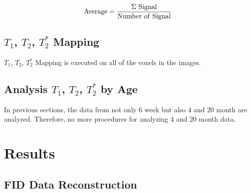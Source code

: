 \documentclass[10pt, a4paper]{article}
\begin{document}
			\begin{equation}
				\rm{Average} = \frac{\Sigma \ Signal}{\rm{Number \ of \ Signal}}
				\label{eq:average}
			\end{equation}
		
			
		
		\subsection{$T_1$, $T_2$, $T_2^*$ Mapping}
			$T_1$, $T_2$, $T_2^*$ Mapping is executed on all of the voxels in the images. 
		
			
		
		\subsection{Analysis $T_1$, $T_2$, $T_2^*$  by Age}
			In previous sections, the data from not only 6 week but also 4 and 20 month are analyzed. Therefore, no more procedures for analyzing 4 and 20 month data. 
	
	\section{Results}
		\subsection{FID Data Reconstruction}
\end{document}
